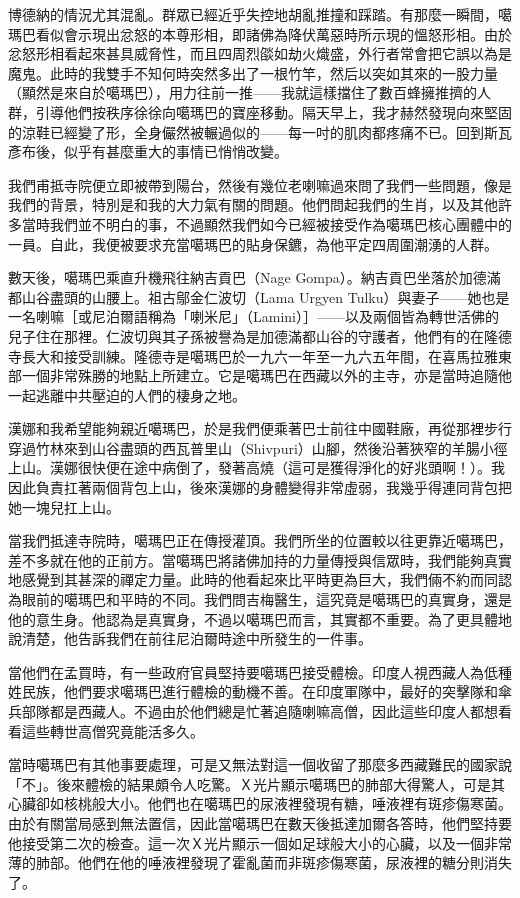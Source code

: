 博德納的情況尤其混亂。群眾已經近乎失控地胡亂推撞和踩踏。有那麼一瞬間，噶瑪巴看似會示現出忿怒的本尊形相，即諸佛為降伏萬惡時所示現的慍怒形相。由於忿怒形相看起來甚具威脅性，而且四周烈燄如劫火熾盛，外行者常會把它誤以為是魔鬼。此時的我雙手不知何時突然多出了一根竹竿，然后以突如其來的一股力量（顯然是來自於噶瑪巴），用力往前一推——我就這樣擋住了數百蜂擁推擠的人群，引導他們按秩序徐徐向噶瑪巴的寶座移動。隔天早上，我才赫然發現向來堅固的涼鞋已經變了形，全身儼然被輾過似的——每一吋的肌肉都疼痛不已。回到斯瓦彥布後，似乎有甚麼重大的事情已悄悄改變。

我們甫抵寺院便立即被帶到陽台，然後有幾位老喇嘛過來問了我們一些問題，像是我們的背景，特別是和我的大力氣有關的問題。他們問起我們的生肖，以及其他許多當時我們並不明白的事，不過顯然我們如今已經被接受作為噶瑪巴核心團體中的一員。自此，我便被要求充當噶瑪巴的貼身保鑣，為他平定四周圍潮湧的人群。　

數天後，噶瑪巴乘直升機飛往納吉貢巴（Nage
Gompa）。納吉貢巴坐落於加德滿都山谷盡頭的山腰上。祖古鄔金仁波切（Lama
Urgyen Tulku）與妻子——她也是一名喇嘛［或尼泊爾語稱為「喇米尼」（Lamini）］——以及兩個皆為轉世活佛的兒子住在那裡。仁波切與其子孫被譽為是加德滿都山谷的守護者，他們有的在隆德寺長大和接受訓練。隆德寺是噶瑪巴於一九六一年至一九六五年間，在喜馬拉雅東部一個非常殊勝的地點上所建立。它是噶瑪巴在西藏以外的主寺，亦是當時追隨他一起逃離中共壓迫的人們的棲身之地。


漢娜和我希望能夠親近噶瑪巴，於是我們便乘著巴士前往中國鞋廠，再從那裡步行穿過竹林來到山谷盡頭的西瓦普里山（Shivpuri）山腳，然後沿著狹窄的羊腸小徑上山。漢娜很快便在途中病倒了，發著高燒（這可是獲得淨化的好兆頭啊！）。我因此負責扛著兩個背包上山，後來漢娜的身體變得非常虛弱，我幾乎得連同背包把她一塊兒扛上山。

當我們抵達寺院時，噶瑪巴正在傳授灌頂。我們所坐的位置較以往更靠近噶瑪巴，差不多就在他的正前方。當噶瑪巴將諸佛加持的力量傳授與信眾時，我們能夠真實地感覺到其甚深的禪定力量。此時的他看起來比平時更為巨大，我們倆不約而同認為眼前的噶瑪巴和平時的不同。我們問吉梅醫生，這究竟是噶瑪巴的真實身，還是他的意生身。他認為是真實身，不過以噶瑪巴而言，其實都不重要。為了更具體地說清楚，他告訴我們在前往尼泊爾時途中所發生的一件事。

當他們在孟買時，有一些政府官員堅持要噶瑪巴接受體檢。印度人視西藏人為低種姓民族，他們要求噶瑪巴進行體檢的動機不善。在印度軍隊中，最好的突擊隊和傘兵部隊都是西藏人。不過由於他們總是忙著追隨喇嘛高僧，因此這些印度人都想看看這些轉世高僧究竟能活多久。

當時噶瑪巴有其他事要處理，可是又無法對這一個收留了那麼多西藏難民的國家說「不」。後來體檢的結果頗令人吃驚。Ｘ光片顯示噶瑪巴的肺部大得驚人，可是其心臟卻如核桃般大小。他們也在噶瑪巴的尿液裡發現有糖，唾液裡有斑疹傷寒菌。由於有關當局感到無法置信，因此當噶瑪巴在數天後抵達加爾各答時，他們堅持要他接受第二次的檢查。這一次Ｘ光片顯示一個如足球般大小的心臟，以及一個非常薄的肺部。他們在他的唾液裡發現了霍亂菌而非斑疹傷寒菌，尿液裡的糖分則消失了。

